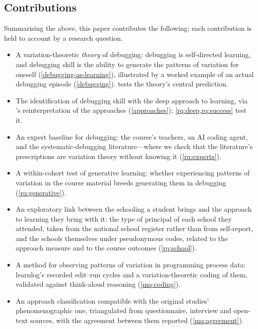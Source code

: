 \subsection{Contributions}

Summarising the above, this paper contributes the following; each
contribution is held to account by a research question.
\begin{itemize}
  \item A variation-theoretic \emph{theory} of debugging: debugging is
    self-directed learning, and debugging skill is the ability to
    generate the patterns of variation for oneself
    (\cref{debugging-as-learning}), illustrated by a worked example of an
    actual debugging episode (\cref{debugging}).
     tests the theory's central prediction.
  \item The identification of debugging skill with the deep approach to
    learning, via \citeauthor{NCOL}'s reinterpretation of the approaches
    (\cref{approaches}); \cref{rq:deep,rq:success} test it.
  \item An expert baseline for debugging: the course's teachers, an AI
    coding agent, and the systematic-debugging literature---where we
    check that the literature's prescriptions are variation theory
    without knowing it (\cref{rq:experts}).
  \item A within-cohort test of generative learning: whether experiencing
    patterns of variation in the course material breeds generating them
    in debugging (\cref{rq:generative}).
  \item An exploratory link between the schooling a student brings and
    the approach to learning they bring with it: the type of principal
    of each school they attended, taken from the national school
    register rather than from self-report, and the schools themselves
    under pseudonymous codes, related to the approach measure and to the
    course outcomes (\cref{rq:school}).
  \item A method for observing patterns of variation in programming
    process data: learnlog's recorded edit--run cycles and a
    variation-theoretic coding of them, validated against think-aloud
    reasoning (\cref{mq:coding}).
  \item An approach classification compatible with the original studies'
    phenomenographic one, triangulated from questionnaire, interview and
    open-text sources, with the agreement between them reported
    (\cref{mq:agreement}).
\end{itemize}

